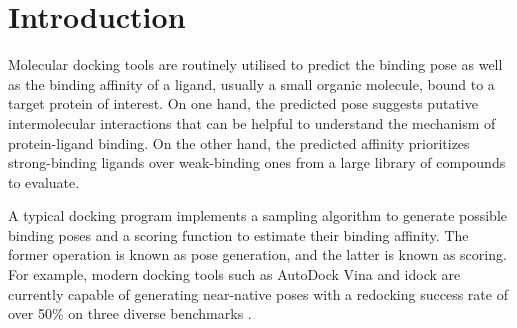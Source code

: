 \documentclass[twocolumn]{bmcart}
\begin{document}


\section*{Introduction}

Molecular docking tools are routinely utilised to predict the binding pose as well as the binding affinity of a ligand, usually a small organic molecule, bound to a target protein of interest. On one hand, the predicted pose suggests putative intermolecular interactions that can be helpful to understand the mechanism of protein-ligand binding. On the other hand, the predicted affinity prioritizes strong-binding ligands over weak-binding ones from a large library of compounds to evaluate.

A typical docking program implements a sampling algorithm to generate possible binding poses and a scoring function to estimate their binding affinity. The former operation is known as pose generation, and the latter is known as scoring. For example, modern docking tools such as AutoDock Vina \cite{595} and idock \cite{1362} are currently capable of generating near-native poses with a redocking success rate of over 50\% on three diverse benchmarks \cite{1362}.
\end{document}
